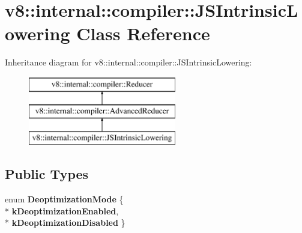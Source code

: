 \hypertarget{classv8_1_1internal_1_1compiler_1_1_j_s_intrinsic_lowering}{}\section{v8\+:\+:internal\+:\+:compiler\+:\+:J\+S\+Intrinsic\+Lowering Class Reference}
\label{classv8_1_1internal_1_1compiler_1_1_j_s_intrinsic_lowering}
Inheritance diagram for v8\+:\+:internal\+:\+:compiler\+:\+:J\+S\+Intrinsic\+Lowering\+:\begin{figure}[H]
\begin{center}
\leavevmode
\includegraphics[height=3.000000cm]{classv8_1_1internal_1_1compiler_1_1_j_s_intrinsic_lowering}
\end{center}
\end{figure}
\subsection*{Public Types}
\begin{DoxyCompactItemize}
\item 
enum {\bfseries Deoptimization\+Mode} \{ \\*
{\bfseries k\+Deoptimization\+Enabled}, 
\\*
{\bfseries k\+Deoptimization\+Disabled}
 \}\hypertarget{classv8_1_1internal_1_1compiler_1_1_j_s_intrinsic_lowering_a8705859b0b0f41eb2b06e4aa18826c9b}{}\label{classv8_1_1internal_1_1compiler_1_1_j_s_intrinsic_lowering_a8705859b0b0f41eb2b06e4aa18826c9b}

\end{DoxyCompactItemize}
